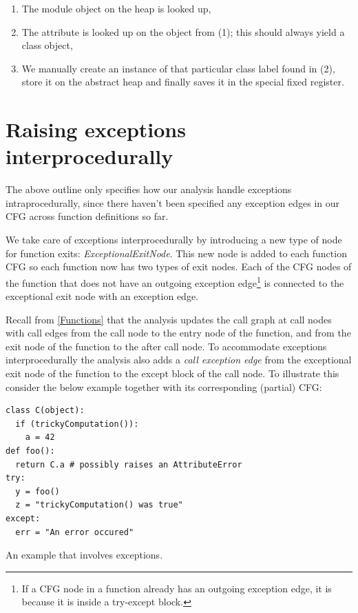 \begin{enumerate}
	\item The  module object on the heap is looked up,
	\item The attribute  is looked up on the  object from (1); this should always yield a class object,
	\item We manually create an instance of that particular class label found in (2), store it on the abstract heap and finally saves it in the special fixed register.
\end{enumerate}


\section{Raising exceptions interprocedurally}
The above outline only specifies how our analysis handle exceptions intraprocedurally, since there haven't been specified any exception edges in our CFG across function definitions so far.

We take care of exceptions interprocedurally by introducing a new type of node for function exits: \textit{ExceptionalExitNode}. This new node is added to each function CFG so each function now has two types of exit nodes. Each of the CFG nodes of the function that does not have an outgoing exception edge\footnote{If a CFG node in a function already has an outgoing exception edge, it is because it is inside a try-except block.} is connected to the exceptional exit node with an exception edge.

Recall from \autoref{Functions} that the analysis updates the call graph at call nodes with call edges from the call node to the entry node of the function, and from the exit node of the function to the after call node. To accommodate exceptions interprocedurally the analysis also adds a \textit{call exception edge} from the exceptional exit node of the function to the except block of the call node. To illustrate this consider the below example together with its corresponding (partial) CFG:

\begin{listing}[H]
	\begin{verbatim}
class C(object):
  if (trickyComputation()):
    a = 42
def foo():
  return C.a # possibly raises an AttributeError
try:
  y = foo()
  z = "trickyComputation() was true"
except:
  err = "An error occured"
	\end{verbatim}
	\caption{An example that involves exceptions.}
	\label{code:NameExceptionExample}
\end{listing}

